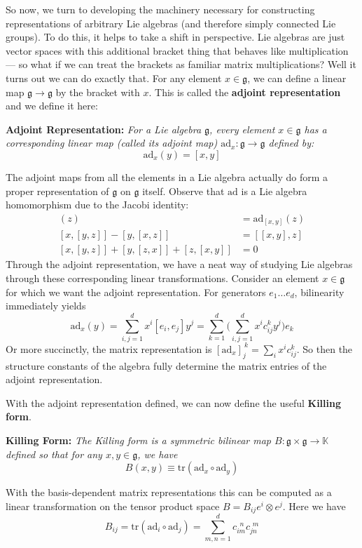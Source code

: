 \documentclass{article}
\renewcommand{\t}[1]{\text{#1}}
\newcommand{\definition}[2]{
	\begin{center}
		\begin{tcolorbox}[colframe=MidnightBlue, colback=black!5, arc=2mm, outer arc=0.5mm, width=\linewidth, left=2mm, right=2mm]
			\textbf{#1:} \emph{#2}	
		\end{tcolorbox}
	\end{center}\noindent}
\begin{document}
So now, we turn to developing the machinery necessary for constructing representations of arbitrary Lie algebras (and therefore simply connected Lie groups). To do this, it helps to take a shift in perspective. Lie algebras are just vector spaces with this additional bracket thing that behaves like multiplication --- so what if we can treat the brackets as familiar matrix multiplications? Well it turns out we can do exactly that. For any element $x\in\mathfrak{g}$, we can define a linear map $\mathfrak{g}\to\mathfrak{g}$ by the bracket with $x$. This is called the \textbf{adjoint representation} and we define it here:

\definition{Adjoint Representation}{For a Lie algebra $\mathfrak{g}$, every element $x\in\mathfrak{g}$ has a corresponding linear map (called its adjoint map) $\t{ad}_x:\mathfrak{g}\to\mathfrak{g}$ defined by:
$$ \t{ad}_x(y) = [x,y] $$}
The adjoint maps from all the elements in a Lie algebra actually do form a proper representation of $\mathfrak{g}$ on $\mathfrak{g}$ itself. Observe that $\t{ad}$ is a Lie algebra homomorphism due to the Jacobi identity:
\begin{align*} 
	[\t{ad}_x, \t{ad}_y](z) &= \t{ad}_{[x,y]}(z) \\
 [x, [y, z]] - [y, [x, z]] &= [[x,y], z] \\
 [x, [y, z]] + [y, [z, x]] + [z, [x,y]] &= 0
\end{align*}
Through the adjoint representation, we have a neat way of studying Lie algebras through these corresponding linear transformations. Consider an element $x\in\mathfrak{g}$ for which we want the adjoint representation. For generators $e_1\dots e_d$, bilinearity immediately yields 
$$\t{ad}_x(y) = \sum_{i,j=1}^d x^i[e_i,e_j]y^j = \sum_{k=1}^d \bigg(\sum_{i,j=1}^d x^i c_{ij}^k y^j\bigg)e_k$$
Or more succinctly, the matrix representation is $[\t{ad}_x]_j^{\:k} = \sum_i x^ic^k_{ij} $. So then the structure constants of the algebra fully determine the matrix entries of the adjoint representation.

With the adjoint representation defined, we can now define the useful \textbf{Killing form}.

\definition{Killing Form}{The Killing form is a symmetric bilinear map $B:\mathfrak{g}\times\mathfrak{g}\to \mathbb{K}$ defined so that for any $x,y\in\mathfrak{g}$, we have
$$ B(x,y) \equiv \t{tr}(\t{ad}_x \circ \t{ad}_y) $$}
With the basis-dependent matrix representations this can be computed as a linear transformation on the tensor product space $B = B_{ij} e^i \otimes e^j$. Here we have
$$ B_{ij} = \t{tr}(\t{ad}_i\circ \t{ad}_j) = \sum_{m,n=1}^d c_{im}^{\:\:n} c_{jn}^{\:\,m} $$
\end{document}
